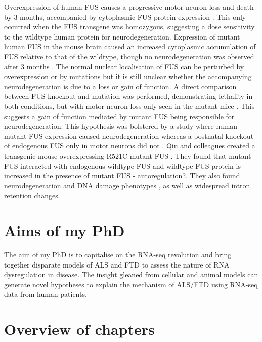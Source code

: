 Overexpression of human FUS causes a progressive motor neuron loss and death by 3 months, accompanied by cytoplasmic FUS protein expression \citep{Mitchell2013}. 
This only occurred when the FUS transgene was homozygous, suggesting a dose sensitivity to the wildtype human protein for neurodegeneration. 
Expression of mutant human FUS in the mouse brain caused an increased cytoplasmic accumulation of FUS relative to that of the wildtype, though no neurodegeneration was observed after 3 months \citep{Verbeeck2012}. 
The normal nuclear localisation of FUS can be perturbed by overexpression or by mutations but it is still unclear whether the accompanying neurodegeneration is due to a loss or gain of function. 
A direct comparison between FUS knockout and mutation was performed, demonstrating lethality in both conditions, but with motor neuron loss only seen in the mutant mice \citep{Scekic-zahirovic2016}. This suggests a gain of function mediated by mutant FUS being responsible for neurodegeneration. 
This hypothesis was bolstered by a study where human mutant FUS expression caused neurodegeneration whereas a postnatal knockout of endogenous FUS only in motor neurons did not \citep{Sharma2016}. 
Qiu and colleagues created a transgenic mouse overexpressing R521C mutant FUS \citeyear{Qiu2014}. 
They found that mutant FUS interacted with endogenous wildtype FUS and wildtype FUS protein is increased in the presence of mutant FUS - autoregulation?. They also found neurodegeneration and DNA damage phenotypes , as well as widespread intron retention changes. 







\section{Aims of my PhD} %

The aim of my PhD is to capitalise on the RNA-seq revolution and bring together disparate models of ALS and FTD to assess the nature of RNA dysregulation in disease.
The insight gleaned from cellular and animal models can generate novel hypotheses to explain the mechanism of ALS/FTD using RNA-seq data from human patients.

\section{Overview of chapters}

